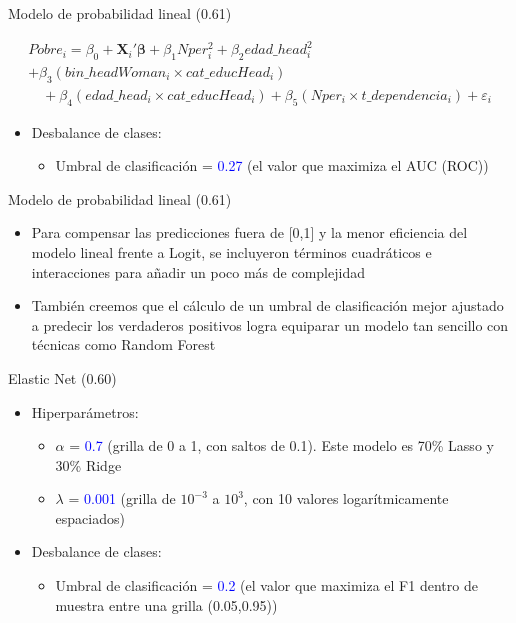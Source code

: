 \documentclass[11pt]{beamer}
\begin{document}
\begin{frame}{Modelo de probabilidad lineal (0.61)}

\begin{equation} %
\begin{aligned}
Pobre_i = \beta_0 + \mathbf{X}_i'\boldsymbol{\beta}
+ \beta_1 Nper_i^2 + \beta_2 edad\_head_i^2 \\
+ \beta_3 (bin\_headWoman_i \times cat\_educHead_i) \\
\quad + \beta_4 (edad\_head_i \times cat\_educHead_i)
+ \beta_5 (Nper_i \times t\_dependencia_i)
+ \varepsilon_i
\end{aligned}
\end{equation}

\begin{itemize}
\item Desbalance de clases:
\begin{itemize}
    \item Umbral de clasificación = \textcolor{blue}{0.27} (el valor que maximiza el AUC (ROC))
\end{itemize}

\end{itemize}
\end{frame}

\begin{frame}{Modelo de probabilidad lineal (0.61)}
 
    \begin{itemize}
    \item Para compensar las predicciones fuera de [0,1] y la menor eficiencia del modelo lineal frente a Logit, se incluyeron términos cuadráticos e interacciones para añadir un poco más de complejidad
    \item También creemos que el cálculo de un umbral de clasificación mejor ajustado a predecir los verdaderos positivos logra equiparar un modelo tan sencillo con técnicas como Random Forest
    \end{itemize}
\end{frame}

\begin{frame}{Elastic Net (0.60)}
\begin{itemize}
    \item Hiperparámetros:
\begin{itemize}
    \item $\alpha$ = \textcolor{blue}{0.7} (grilla de 0 a 1, con saltos de 0.1). Este modelo es 70\% Lasso y 30\%  Ridge
    \item $\lambda$ = \textcolor{blue}{0.001} (grilla de $10^{-3}$ a $10^3$, con 10 valores logarítmicamente espaciados)
\end{itemize}
\item Desbalance de clases: 
\begin{itemize}
    \item Umbral de clasificación = \textcolor{blue}{0.2} (el valor que maximiza el F1 dentro de muestra entre una grilla (0.05,0.95))
\end{itemize}
\end{itemize}
\end{frame}
\end{document}
